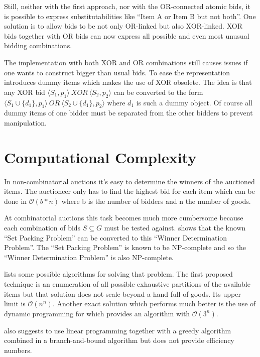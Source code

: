 \documentclass[a4paper]{paper}
\begin{document}
Still, neither with the first approach, nor with the OR-connected atomic bids, it is possible to express substitutabilities like ``Item A or Item B but not both''. One solution is to allow bids to be not only OR-linked but also XOR-linked. XOR bids together with OR bids can now express all possible and even most unusual bidding combinations.

The implementation with both XOR and OR combinations still causes issues if one wants to construct bigger than usual bids. To ease the representation \cite{FLBS99} introduces dummy items which makes the use of XOR obsolete. The idea is that any XOR bid $\langle S_1, p_1 \rangle \ XOR \ \langle S_2, p_2 \rangle $ can be converted to the form $\langle S_1 \cup \{d_1\}, p_1 \rangle \ OR \ \langle S_2 \cup \{d_1\}, p_2 \rangle $ where $d_1$ is such a dummy object. Of course all dummy items of one bidder must be separated from the other bidders to prevent manipulation.

\section{Computational Complexity}

In non-combinatorial auctions it's easy to determine the winners of the auctioned items. The auctioneer only has to find the highest bid for each item which can be done in $\mathcal O(b * n)$ where b is the number of bidders and n the number of goods.

At combinatorial auctions this task becomes much more cumbersome because each combination of bids $S \subseteq G$ must be tested against. \cite[pp.~46--47]{BCE12} shows that the known ``Set Packing Problem'' can be converted to this ``Winner Determination Problem''. The ``Set Packing Problem'' is known to be NP-complete and so the ``Winner Determination Problem'' is also NP-complete.

\cite[Chapter~2]{San02} lists some possible algorithms for solving that problem. The first proposed technique is an enumeration of all possible exhaustive partitions of the available items but that solution does not scale beyond a hand full of goods. Its upper limit is $\mathcal O(n^n)$. Another exact solution which performs much better is the use of dynamic programming for which \cite[Chapter~2.2]{San02} provides an algorithm with $\mathcal O(3^n)$.

\cite{Nis00} also suggests to use linear programming together with a greedy algorithm combined in a branch-and-bound algorithm but does not provide efficiency numbers.
\end{document}
